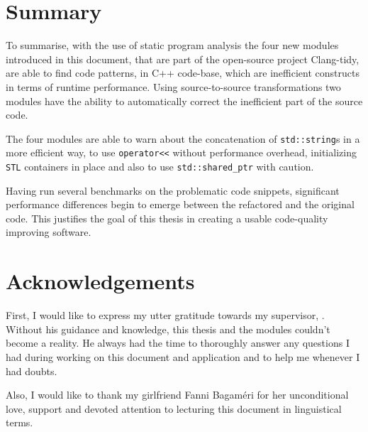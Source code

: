 \section{Summary}
\par To summarise, with the use of static program analysis the four new modules introduced in this document, that are part of the open-source project Clang-tidy, are able to find code patterns, in C++ code-base, which are inefficient constructs in terms of runtime performance. Using source-to-source transformations two modules have the ability to automatically correct the inefficient part of the source code. \medskip
\par The four modules are able to warn about the concatenation of \verb|std::string|s in a more efficient way, to use \verb|operator<<| without performance overhead, initializing \verb|STL| containers in place and also to use \verb|std::shared_ptr| with caution. \medskip
\par Having run several benchmarks on the problematic code snippets, significant performance differences begin to emerge between the refactored and the original code. This justifies the goal of this thesis in creating a usable code-quality improving software.
\pagebreak
\section{Acknowledgements}
\par First, I would like to express my utter gratitude towards my supervisor, \SupervisorName. Without his guidance and knowledge, this thesis and the modules couldn't become a reality. He always had the time to thoroughly answer any questions I had during working on this document and application and to help me whenever I had doubts. \medskip
\par Also, I would like to thank my girlfriend Fanni Bagaméri for her unconditional love, support and devoted attention to lecturing this document in linguistical terms.